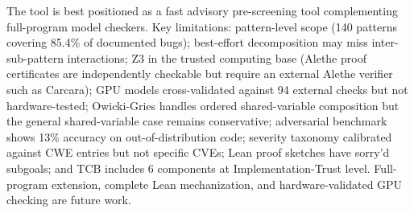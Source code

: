 \documentclass[11pt]{article}
\begin{document}
\noindent
The tool is best positioned as a fast advisory pre-screening tool
complementing full-program model checkers. Key limitations:
pattern-level scope (140 patterns covering 85.4\% of documented bugs);
best-effort decomposition may miss
inter-sub-pattern interactions; Z3 in the trusted computing base
(Alethe proof certificates are independently checkable but require
an external Alethe verifier such as Carcara); GPU models cross-validated
against 94 external checks but not hardware-tested; Owicki-Gries handles
ordered shared-variable composition but the general shared-variable case
remains conservative; adversarial benchmark shows 13\% accuracy on
out-of-distribution code; severity taxonomy calibrated against CWE
entries but not specific CVEs; Lean proof sketches have sorry'd subgoals;
and TCB includes 6 components at Implementation-Trust level.
Full-program extension, complete Lean mechanization, and
hardware-validated GPU checking are future work.


\end{document}
